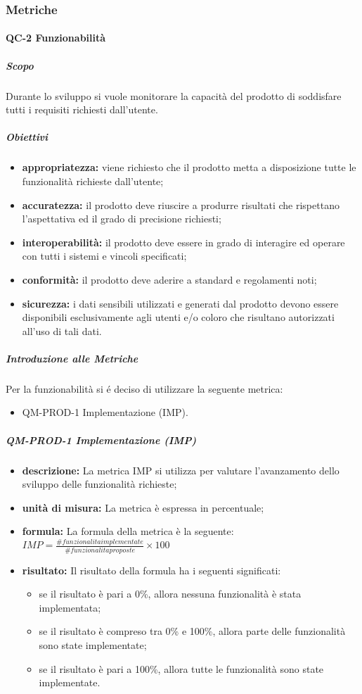 		\subsubsection{Metriche}


		\paragraph{QC-2 Funzionabilità}
			\subparagraph{Scopo}
				Durante lo sviluppo si vuole monitorare la capacità del prodotto di soddisfare tutti i requisiti richiesti dall'utente.
			\subparagraph{Obiettivi}
				\begin{itemize}
					\item \textbf{appropriatezza:} viene richiesto che il prodotto metta a disposizione tutte le funzionalità richieste dall'utente;
					\item \textbf{accuratezza:} il prodotto deve riuscire a produrre risultati che rispettano l'aspettativa ed il grado di precisione richiesti;
					\item \textbf{interoperabilità:} il prodotto deve essere in grado di interagire ed operare con tutti i sistemi e vincoli specificati;
					\item \textbf{conformità:} il prodotto deve aderire a standard e regolamenti noti;
					\item \textbf{sicurezza:} i dati sensibili utilizzati e generati dal prodotto devono essere disponibili esclusivamente agli utenti e/o coloro che risultano autorizzati all'uso di tali dati.
				\end{itemize}
			\subparagraph{Introduzione alle Metriche}
				Per la funzionabilità si é deciso di utilizzare la seguente metrica:
				\begin{itemize}
					\item QM-PROD-1 Implementazione (IMP).
				\end{itemize}
			\subparagraph{QM-PROD-1 Implementazione (IMP)}
			\begin{itemize}
      			\item \textbf{descrizione: }
					La metrica IMP si utilizza per valutare l'avanzamento dello sviluppo delle funzionalità richieste;
				\item \textbf{unità di misura: }
					La metrica è espressa in percentuale;
				\item \textbf{formula: }
					La formula della metrica è la seguente:
					\(
						IMP = \frac{\# funzionalita implementate}{\# funzionalita proposte}\times100
					\)
				\item \textbf{risultato: }
					Il risultato della formula ha i seguenti significati:
					\begin{itemize}
						\item se il risultato è pari a 0\%, allora nessuna funzionalità è stata implementata;
						\item se il risultato è compreso tra 0\% e 100\%, allora parte delle funzionalità sono state implementate;
						\item se il risultato è pari a 100\%, allora tutte le funzionalità sono state implementate.
					\end{itemize}
			\end{itemize}
